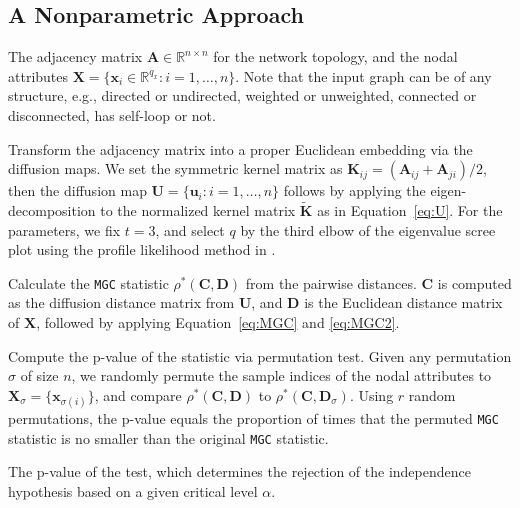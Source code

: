\documentclass[12pt]{article}
\theoremstyle{definition}
\begin{document}
	\subsection{A Nonparametric Approach}
	\label{ssec:method}
	\begin{description}[align=left]
		\item [Input: ]  The adjacency matrix $\mathbf{A} \in \mathbb{R}^{n \times n}$ for the network topology, and the nodal attributes $\mathbf{X}=\{\mathbf{x}_i \in \mathbb{R}^{q_{x}} : i=1,\ldots,n\}$. Note that the input graph can be of any structure, e.g., directed or undirected, weighted or unweighted, connected or disconnected, has self-loop or not. 
		
		\item [Step 1:] Transform the adjacency matrix into a proper Euclidean embedding via the diffusion maps. We set the symmetric kernel matrix as $\mathbf{K}_{ij}=(\mathbf{A}_{ij}+\mathbf{A}_{ji})/2$, then the diffusion map $\mathbf{U}=\{\mathbf{u}_{i} : i=1,\ldots,n\}$ follows by applying the eigen-decomposition to the normalized kernel matrix $\mathbf{\widetilde{K}}$ as in Equation~\ref{eq:U}. For the parameters, we fix $t=3$, and select $q$ by the third elbow of the eigenvalue scree plot using the profile likelihood method in \cite{ZhuGhodsi2006}.
		
		\item [Step 2:] Calculate the \texttt{MGC} statistic $\rho^{*}(\mathbf{C}, \mathbf{D})$ from the pairwise distances. $\mathbf{C}$ is computed as the diffusion distance matrix from $\mathbf{U}$, and $\mathbf{D}$ is the Euclidean distance matrix of $\mathbf{X}$, followed by applying Equation~\ref{eq:MGC} and \ref{eq:MGC2}.
		
		\item [Step 3:] Compute the p-value of the statistic via permutation test. Given any permutation $\sigma$ of size $n$, we randomly permute the sample indices of the nodal attributes to $\mathbf{X}_{\sigma}=\{\mathbf{x}_{\sigma(i)}\}$, and compare $\rho^{*}(\mathbf{C}, \mathbf{D})$ to $\rho^{*}(\mathbf{C}, \mathbf{D}_{\sigma})$. Using $r$ random permutations, the p-value equals the proportion of times that the permuted \texttt{MGC} statistic is no smaller than the original \texttt{MGC} statistic. 
		
		\item [Output:] The p-value of the test, which determines the rejection of the independence hypothesis based on a given critical level $\alpha$.
	\end{description}
	
\end{document}
